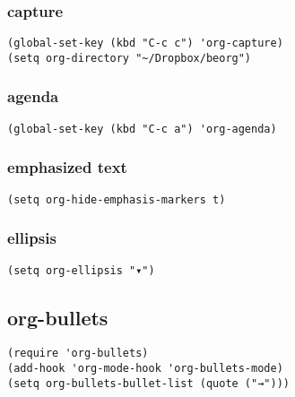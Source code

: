 \documentclass[11pt]{article}
\begin{document}
\subsubsection{capture}
\label{sec:org61e1f2b}
\begin{verbatim}
(global-set-key (kbd "C-c c") 'org-capture)
(setq org-directory "~/Dropbox/beorg")
\end{verbatim}

\subsubsection{agenda}
\label{sec:org025792a}
\begin{verbatim}
(global-set-key (kbd "C-c a") 'org-agenda)
\end{verbatim}

\subsubsection{emphasized text}
\label{sec:org0b4273f}
\begin{verbatim}
(setq org-hide-emphasis-markers t)
\end{verbatim}
\subsubsection{ellipsis}
\label{sec:orgaf41df4}
\begin{verbatim}
(setq org-ellipsis "▾")
\end{verbatim}
\subsection{org-bullets}
\label{sec:orgc2d5b7d}
\begin{verbatim}
(require 'org-bullets)
(add-hook 'org-mode-hook 'org-bullets-mode)
(setq org-bullets-bullet-list (quote ("→")))
\end{verbatim}
\end{document}
